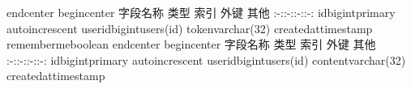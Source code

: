 {}\markdownRendererBackslash{}end\markdownRendererLeftBrace{}center\markdownRendererRightBrace{}\markdownRendererInterblockSeparator
{}\markdownRendererInterblockSeparator
{}\markdownRendererBackslash{}begin\markdownRendererLeftBrace{}center\markdownRendererRightBrace{}\markdownRendererInterblockSeparator
{}\markdownRendererPipe{} 字段名称 \markdownRendererPipe{} 类型 \markdownRendererPipe{} 索引 \markdownRendererPipe{} 外键 \markdownRendererPipe{} 其他 \markdownRendererPipe{} \markdownRendererPipe{}:-:\markdownRendererPipe{}:-:\markdownRendererPipe{}:-:\markdownRendererPipe{}:-:\markdownRendererPipe{} \markdownRendererPipe{}id\markdownRendererPipe{}bigint\markdownRendererPipe{}primary\markdownRendererPipe{}\markdownRendererPipe{} auto\markdownRendererBackslash{}\markdownRendererUnderscore{}increscent\markdownRendererPipe{} \markdownRendererPipe{}user\markdownRendererBackslash{}\markdownRendererUnderscore{}id\markdownRendererPipe{}bigint\markdownRendererPipe{}\markdownRendererPipe{}users(id)\markdownRendererPipe{}\markdownRendererPipe{} \markdownRendererPipe{}token\markdownRendererPipe{}varchar(32)\markdownRendererPipe{}\markdownRendererPipe{}\markdownRendererPipe{}\markdownRendererPipe{} \markdownRendererPipe{}created\markdownRendererBackslash{}\markdownRendererUnderscore{}at\markdownRendererPipe{}timestamp\markdownRendererPipe{}\markdownRendererPipe{}\markdownRendererPipe{}\markdownRendererPipe{} \markdownRendererPipe{}remember\markdownRendererBackslash{}\markdownRendererUnderscore{}me\markdownRendererPipe{}boolean\markdownRendererPipe{}\markdownRendererPipe{}\markdownRendererPipe{}\markdownRendererPipe{}\markdownRendererInterblockSeparator
{}\markdownRendererBackslash{}end\markdownRendererLeftBrace{}center\markdownRendererRightBrace{}\markdownRendererInterblockSeparator
{}\markdownRendererInterblockSeparator
{}\markdownRendererBackslash{}begin\markdownRendererLeftBrace{}center\markdownRendererRightBrace{}\markdownRendererInterblockSeparator
{}\markdownRendererPipe{} 字段名称 \markdownRendererPipe{} 类型 \markdownRendererPipe{} 索引 \markdownRendererPipe{} 外键 \markdownRendererPipe{} 其他 \markdownRendererPipe{} \markdownRendererPipe{}:-:\markdownRendererPipe{}:-:\markdownRendererPipe{}:-:\markdownRendererPipe{}:-:\markdownRendererPipe{} \markdownRendererPipe{}id\markdownRendererPipe{}bigint\markdownRendererPipe{}primary\markdownRendererPipe{}\markdownRendererPipe{} auto\markdownRendererBackslash{}\markdownRendererUnderscore{}increscent\markdownRendererPipe{} \markdownRendererPipe{}user\markdownRendererBackslash{}\markdownRendererUnderscore{}id\markdownRendererPipe{}bigint\markdownRendererPipe{}\markdownRendererPipe{}users(id)\markdownRendererPipe{}\markdownRendererPipe{} \markdownRendererPipe{}content\markdownRendererPipe{}varchar(32)\markdownRendererPipe{}\markdownRendererPipe{}\markdownRendererPipe{}\markdownRendererPipe{} \markdownRendererPipe{}created\markdownRendererBackslash{}\markdownRendererUnderscore{}at\markdownRendererPipe{}timestamp\markdownRendererPipe{}\markdownRendererPipe{}\markdownRendererPipe{}\markdownRendererPipe{}\markdownRendererInterblockSeparator
